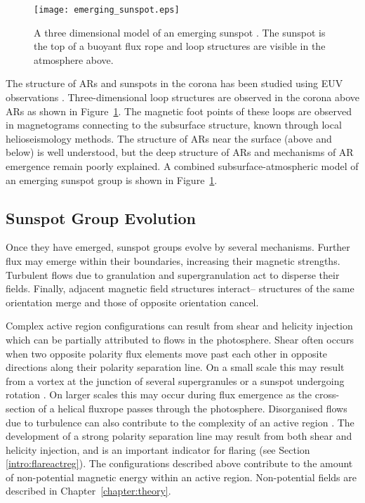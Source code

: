\begin{figure}[!t]
\centerline{\texttt{[image: emerging\_sunspot.eps]}}
\caption[A three dimensional model of an emerging sunspot.]{A three dimensional model of an emerging sunspot \citep[from][]{Abbett:2003}. The sunspot is the top of a buoyant flux rope and loop structures are visible in the atmosphere above.}
\label{subsurface}
\end{figure}

The structure of \glspl{AR} and sunspots in the corona has been studied using \gls{EUV} observations \citep{Aschwanden:1999b}. Three-dimensional loop structures are observed in the corona above \glspl{AR} as shown in Figure~\ref{subsurface}. The magnetic foot points of these loops are observed in magnetograms connecting to the subsurface structure, known through local helioseismology methods. The structure of \glspl{AR} near the surface (above and below) is well understood, but the deep structure of \glspl{AR} and mechanisms of \gls{AR} emergence remain poorly explained. A combined subsurface-atmospheric model of an emerging sunspot group is shown in Figure~\ref{subsurface}.

\subsection{Sunspot Group Evolution}\label{sect:ssevolv}

Once they have emerged, sunspot groups evolve by several mechanisms. Further flux may emerge within their boundaries, increasing their magnetic strengths. Turbulent flows due to granulation and supergranulation act to disperse their fields. Finally, adjacent magnetic field structures interact-- structures of the same orientation merge and those of opposite orientation cancel.

Complex active region configurations can result from shear and helicity injection which can be partially attributed to flows in the photosphere. Shear often occurs when two opposite polarity flux elements move past each other in opposite directions along their polarity separation line. 
On a small scale this may result from a vortex at the junction of several supergranules or a sunspot undergoing rotation \citep{Attie:2009}. On larger scales this may occur during flux emergence as the cross-section of a helical \gls{fluxrope} passes through the photosphere. Disorganised flows due to turbulence can also contribute to the complexity of an active region \citep{Hewett:2008}. The development of a strong polarity separation line may result from both shear and helicity injection, and is an important indicator for flaring (see Section \ref{intro:flareactreg}).
The configurations described above contribute to the amount of non-potential magnetic energy within an active region. Non-potential fields are described in Chapter~\ref{chapter:theory}.

